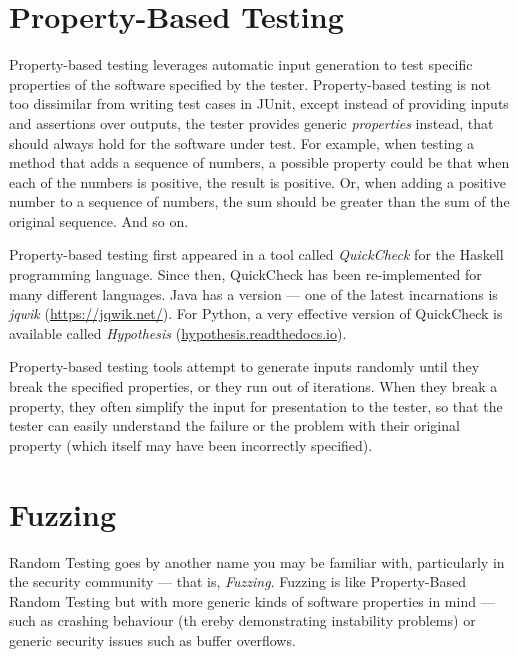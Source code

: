 % 

\section{Property-Based Testing}

Property-based testing leverages automatic input generation to test specific
properties of the software specified by the tester. Property-based testing is
not too dissimilar from writing test cases in JUnit, except instead of providing
inputs and assertions over outputs, the tester provides generic {\it properties}
instead, that should always hold for the software under test. For example, when
testing a method that adds a sequence of numbers, a possible property could be
that when each of the numbers is positive, the result is positive. Or, when
adding a positive number to a sequence of numbers, the sum should be greater
than the sum of the original sequence. And so on.

Property-based testing first appeared in a tool called {\it QuickCheck} for the
Haskell programming language. Since then, QuickCheck has been re-implemented for
many different languages. Java has a version --- one of the latest incarnations
is {\it jqwik} (\url{https://jqwik.net/}). For Python, a very effective version of
QuickCheck is available called {\it Hypothesis} (\url{hypothesis.readthedocs.io}). 

Property-based testing tools attempt to generate inputs randomly until they
break the specified properties, or they run out of iterations. When they break a
property, they often simplify the input for presentation to the tester, so that
the tester can easily understand the failure or the problem with their original
property (which itself may have been incorrectly specified).

\section{Fuzzing}

Random Testing goes by another name you may be familiar with, particularly in
the security community --- that is, {\it Fuzzing}. Fuzzing is like
Property-Based Random Testing but with more generic kinds of software properties
in mind --- such as crashing behaviour (th ereby demonstrating instability
problems) or generic security issues such as buffer overflows.

